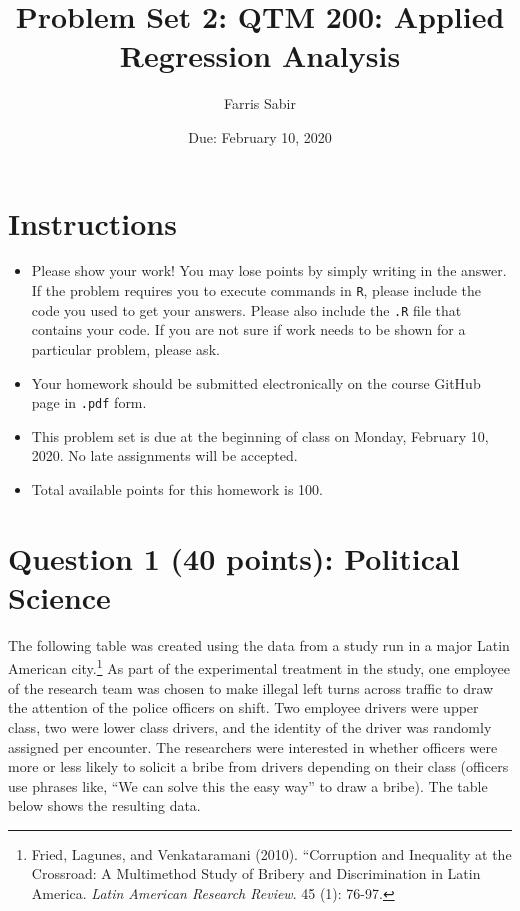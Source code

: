 \documentclass[12pt,letterpaper]{article}
\title{Problem Set 2: QTM 200: Applied Regression Analysis}
\date{Due: February 10, 2020}
\author{Farris Sabir}
\begin{document}
	\maketitle
	
	\section*{Instructions}
	\begin{itemize}
		\item Please show your work! You may lose points by simply writing in the answer. If the problem requires you to execute commands in \texttt{R}, please include the code you used to get your answers. Please also include the \texttt{.R} file that contains your code. If you are not sure if work needs to be shown for a particular problem, please ask.
		\item Your homework should be submitted electronically on the course GitHub page in \texttt{.pdf} form.
		\item This problem set is due at the beginning of class on Monday, February 10, 2020. No late assignments will be accepted.
		\item Total available points for this homework is 100.
	\end{itemize}
	
	\vspace{.5cm}
	\section*{Question 1 (40 points): Political Science}
		\vspace{.25cm}
	The following table was created using the data from a study run in a major Latin American city.\footnote{Fried, Lagunes, and Venkataramani (2010). ``Corruption and Inequality at the Crossroad: A Multimethod Study of Bribery and Discrimination in Latin America. \textit{Latin American Research Review}. 45 (1): 76-97.} As part of the experimental treatment in the study, one employee of the research team was chosen to make illegal left turns across traffic to draw the attention of the police officers on shift. Two employee drivers were upper class, two were lower class drivers, and the identity of the driver was randomly assigned per encounter. The researchers were interested in whether officers were more or less likely to solicit a bribe from drivers depending on their class (officers use phrases like, ``We can solve this the easy way'' to draw a bribe). The table below shows the resulting data.
\end{document}
